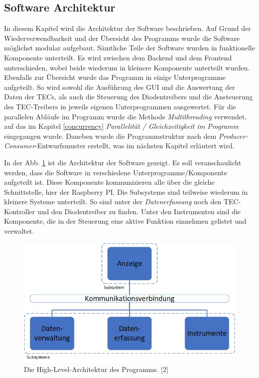 \subsection{Software Architektur}
\label{lab_software_architecture}
In diesem Kapitel wird die Architektur der Software beschrieben. Auf Grund der Wiederverwendbarkeit und der Übersicht des Programms wurde die Software möglichst modular aufgebaut. Sämtliche Teile der Software wurden in funktionelle Komponente unterteilt. Es wird zwischen dem Backend und dem Frontend unterschieden, wobei beide wiederum in kleinere Komponente unterteilt wurden. Ebenfalls zur Übersicht wurde das Programm in einige Unterprogramme aufgeteilt. So wird sowohl die Ausführung des GUI und die Auswertung der Daten der TECs, als auch die Steuerung des Diodentreibers und die Ansteuerung des TEC-Treibers in jeweils eigenen Unterprogrammen ausgewertet. Für die parallelen Abläufe im Programm wurde die Methode \textit{Multithreading} verwendet, auf das im Kapitel \ref{concurrency} \textit{Parallelität / Gleichzeitigkeit im Programm} eingegangen wurde. Daneben wurde die Programmstruktur nach dem \textit{Producer-Consumer}-Entwurfsmuster erstellt, was im nächsten Kapitel erläutert wird.

In der Abb. \ref{fig:architecture} ist die Architektur der Software gezeigt. Es soll veranschaulicht werden, dass die Software in verschiedene Unterprogramme/Komponente aufgeteilt ist. Diese Komponente kommunizieren alle über die gleiche Schnittstelle, hier der Raspberry PI. Die Subsysteme sind teilweise wiederum in kleinere Systeme unterteilt. So sind unter der \textit{Datenerfassung} noch den TEC-Kontroller und den Diodentreiber zu finden. Unter den Instrumenten sind die Komponente, die in der Steuerung eine aktive Funktion einnehmen gelistet und verwaltet.

\begin{figure}[H]
    \centering
    \includegraphics[scale=0.6]{98_images/architecture.jpg}
    \caption{Die High-Level-Architektur des Programms. [2]}
    \label{fig:architecture}
\end{figure}

